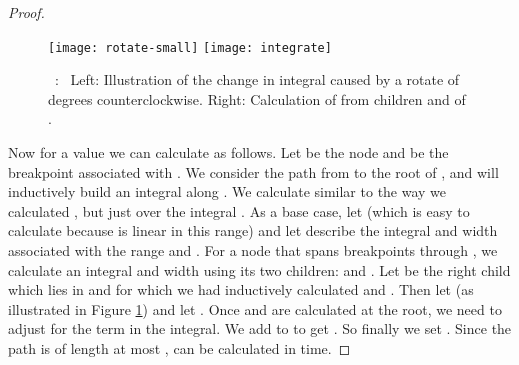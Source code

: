 \documentclass[11pt]{article}
\newcommand\myCaption[1]{\small\refstepcounter{figure}\figurename\ \thefigure :\ #1}
\begin{document}
\begin{proof}
\begin{figure}[h]
\begin{center}
\texttt{[image: rotate-small]} 
\hspace{.8in}
\texttt{[image: integrate]}
\end{center}
\myCaption{\label{fig:rotate} Left: Illustration of the change in integral caused by a rotate of  degrees counterclockwise. 
Right: Calculation of  from children  and  of .}
\end{figure}


Now for a value  we can calculate  as follows.  
Let  be the node and  be the breakpoint associated with .  We consider the path  from  to the root  of , and will inductively build an integral along .  
We calculate  similar to the way we calculated , but just over the integral .  
As a base case, let  (which is easy to calculate because  is linear in this range) and let  describe the integral and width associated with the range  and .  
For a node  that spans breakpoints  through , we calculate an integral  and width  using its two children:  and .  Let  be the right child which lies in  and for which we had inductively calculated  and .  
Then let  (as illustrated in Figure \ref{fig:rotate}) and let .  
Once  and  are calculated at the root, we need to adjust for the  term in the integral.  We add  to  to get .
So finally we set .  
Since the path  is of length at most ,  can be calculated in  time. 
\end{proof}
\end{document}
